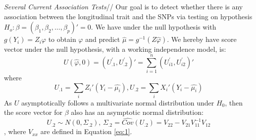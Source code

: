\documentclass[12pt]{article}
\begin{document}
\textit{Several Current Association Tests}//
Our goal is to detect whether there is any association between the longitudinal trait and the SNPs via testing on hypothesis$H_{o}:\beta=(\beta_{1},\beta_{2},\ldots,\beta_{p})'=0$. We have under the null hypothesis with $g(Y_i)=Z_i\varphi$ to obtain $\varphi$ and predict $\hat{\mu}=g^{-1}(Z\hat{\varphi})$. We hereby have score vector under the null hypothesis, with a working independence model, is:
$$U(\hat{\varphi},0)=(U_{.1}^{'}, U_{.2}^{'})'=\sum_{i=1}^{n}(U_{i1}^{'},U_{i2}^{'})'$$
where
$$U_{.1}=\sum_{i}Z_{i}'(Y_{i}-\hat{\mu_{i}}), U_{.2}=\sum_{i}X_{i}'(Y_{i}-\hat{\mu_{i}})$$ 
As $U$ asymptotically follows a multivariate normal distribution under $H_{0}$, then the score vector for $\beta$ also has an asymptotic normal distribution:\\
$$
U_{.2}\sim N(0,\Sigma_{.2}),\,\Sigma_{.2}= \widehat{Cov} (U_{.2}) = V_{22} - V_{21} V_{11}^{-1} V_{12}
$$, where $V_{xx}$ are defined in Equation \ref{eq:1}.
\end{document}
